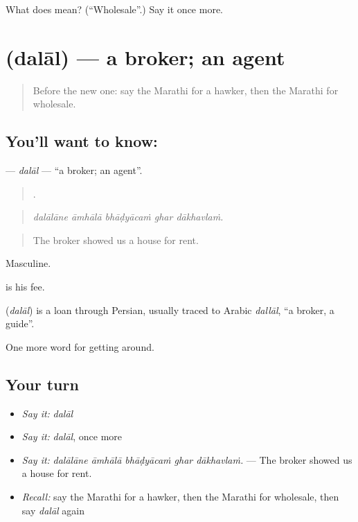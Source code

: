 \begin{tcolorbox}[breakable,colback=teal!4,colframe=teal!35!black,title={Before you move on}]
What does  mean? (\textquotedblleft{}Wholesale\textquotedblright{}.) Say it once more.
\end{tcolorbox}
\section[\texorpdfstring{\mr{दलाल} (dalāl)}{दलाल (dalāl)}]{ (dalāl) — a broker; an agent}

\label{lesson:MR-C424-dalal}



\begin{quote}
Before the new one: say the Marathi for a hawker, then the Marathi for wholesale.
\end{quote}

\subsection*{You'll want to know: }
\textbf{} — \emph{dalāl} — \textquotedblleft{}a broker; an agent\textquotedblright{}.

\begin{quote}
    .
\end{quote}

\begin{quote}
\emph{dalālāne āmhālā bhāḍyācaṁ ghar dākhavlaṁ.}
\end{quote}

\begin{quote}
The broker showed us a house for rent.
\end{quote}

Masculine.

 is his fee.

\begin{cousinweb}
\textbf{} (\emph{dalāl}) is a loan through Persian, usually traced to Arabic \emph{dallāl}, \textquotedblleft{}a broker, a guide\textquotedblright{}.
\end{cousinweb}

\begin{grammarlens}[title={What you've built}]
One more word for getting around.
\end{grammarlens}

\subsection*{Your turn}
\begin{itemize}
\raggedright
  \item \emph{Say it:} \emph{dalāl}
  \item \emph{Say it:} \emph{dalāl}, once more
  \item \emph{Say it:} \emph{dalālāne āmhālā bhāḍyācaṁ ghar dākhavlaṁ.} — The broker showed us a house for rent.
  \item \emph{Recall:} say the Marathi for a hawker, then the Marathi for wholesale, then say \emph{dalāl} again
\end{itemize}

